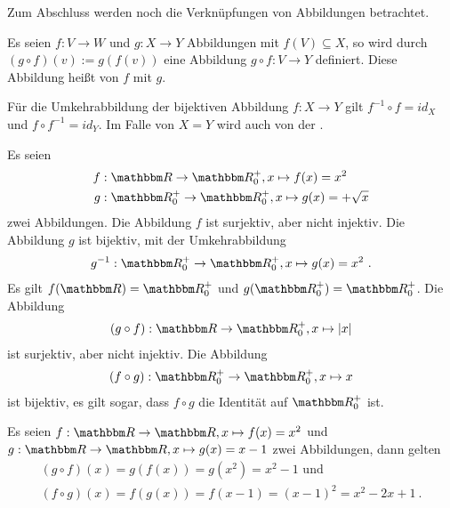 \begin{Unit}
Zum Abschluss werden noch die Verknüpfungen von Abbildungen betrachtet.

\begin{Definition}
  Es seien $f : V \rightarrow W$ und $g : X \rightarrow Y$ Abbildungen mit $f(V) 
  \subseteq X$, so wird durch $(g \circ f)(v) := g(f(v))$ eine Abbildung $g 
  \circ f: V \rightarrow Y$ definiert. Diese Abbildung heißt 
   von $f$ mit $g$.
\end{Definition}

Für die Umkehrabbildung der bijektiven Abbildung $f : X \rightarrow Y$ gilt 
$f^{-1} \circ f = id_X$ und $f \circ f^{-1} = id_Y$. Im Falle von $X = Y$ 
wird auch von der .
\end{Unit} 

\begin{Unit}[Beispiel] 
  Es seien
  \begin{align}
    f&: \RR \rightarrow \RR^+_0, x \mapsto f(x) = x^2 \\
    g&: \RR^+_0 \rightarrow \RR^+_0, x \mapsto g(x) = +\sqrt{x}
  \end{align}
  zwei Abbildungen. Die Abbildung $f$ ist surjektiv, aber nicht injektiv. Die 
  Abbildung $g$ ist bijektiv, mit der Umkehrabbildung
  \begin{align}
    g^{-1}:\RR^+_0 \rightarrow \RR^+_0, x \mapsto g(x) = x^2 \ .
  \end{align}
  Es gilt $f(\RR) = \RR^+_0$ und $g(\RR^+_0) = \RR^+_0$. Die Abbildung
  \begin{align}
    (g \circ f): \RR \rightarrow \RR^+_0, x \mapsto |x|
  \end{align}
  ist surjektiv, aber nicht injektiv. Die Abbildung
  \begin{align}
    (f \circ g):\RR^+_0 \rightarrow \RR^+_0, x \mapsto x
  \end{align}
  ist bijektiv, es gilt sogar, dass $f \circ g$ die Identität auf $\RR^+_0$ 
  ist.
\end{Unit}

\begin{Unit}[Beispiel] 
  Es seien $f: \mg{R} \rightarrow \mg{R}, x \mapsto f(x) = x^2$ und 
  $g: \mg{R} \rightarrow \mg{R}, x \mapsto g(x) = x - 1$ zwei Abbildungen, 
  dann gelten
  \begin{align}
    (g \circ f)(x) = g(f(x)) = g(x^2) = x^2 - 1 \text{ und} \\
    (f \circ g)(x) = f(g(x)) = f(x-1) = (x-1)^2 = x^2 - 2x + 1 \ .
  \end{align}
\end{Unit}

